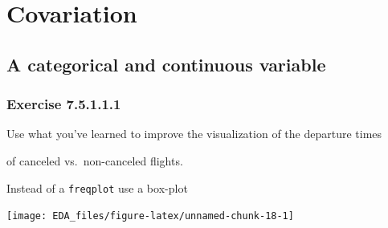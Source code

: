 \documentclass[]{book}
\newenvironment{Shaded}{\begin{snugshade}}{\end{snugshade}}
\newcommand{\DataTypeTok}[1]{\textcolor[rgb]{0.13,0.29,0.53}{#1}}
\newcommand{\DecValTok}[1]{\textcolor[rgb]{0.00,0.00,0.81}{#1}}
\newcommand{\KeywordTok}[1]{\textcolor[rgb]{0.13,0.29,0.53}{\textbf{#1}}}
\newcommand{\NormalTok}[1]{#1}
\newcommand{\OperatorTok}[1]{\textcolor[rgb]{0.81,0.36,0.00}{\textbf{#1}}}
\newcommand{\StringTok}[1]{\textcolor[rgb]{0.31,0.60,0.02}{#1}}
\theoremstyle{plain}
\theoremstyle{remark}
\begin{document}
\hypertarget{covariation}{%
\section{Covariation}\label{covariation}}

\hypertarget{a-categorical-and-continuous-variable}{%
\subsection{A categorical and continuous variable}\label{a-categorical-and-continuous-variable}}

\hypertarget{exercise-7.5.1.1.1}{%
\subsubsection*{\texorpdfstring{Exercise {7.5.1.1.1}}{Exercise 7.5.1.1.1}}\label{exercise-7.5.1.1.1}}

Use what you've learned to improve the visualization of the departure times

of canceled vs.~non-canceled flights.

Instead of a \texttt{freqplot} use a box-plot

\begin{Shaded}
\end{Shaded}

\begin{center}\texttt{[image: EDA\_files/figure-latex/unnamed-chunk-18-1]} \end{center}
\end{document}
